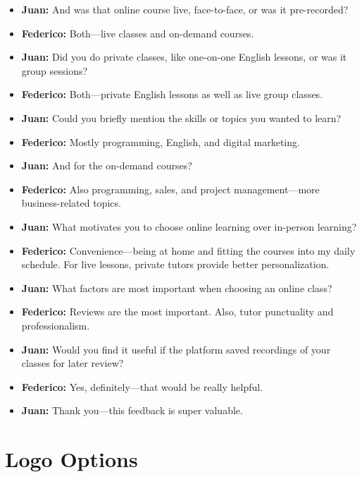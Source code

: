 \begin{enumerate}
\begin{itemize}
        \item \textbf{Juan:} And was that online course live, face-to-face, or was it pre-recorded?
        \item \textbf{Federico:} Both—live classes and on-demand courses.
        \item \textbf{Juan:} Did you do private classes, like one-on-one English lessons, or was it group sessions?
        \item \textbf{Federico:} Both—private English lessons as well as live group classes.
        \item \textbf{Juan:} Could you briefly mention the skills or topics you wanted to learn?
        \item \textbf{Federico:} Mostly programming, English, and digital marketing.
        \item \textbf{Juan:} And for the on-demand courses?
        \item \textbf{Federico:} Also programming, sales, and project management—more business-related topics.
        \item \textbf{Juan:} What motivates you to choose online learning over in-person learning?
        \item \textbf{Federico:} Convenience—being at home and fitting the courses into my daily schedule.
        For live lessons, private tutors provide better personalization.
        \item \textbf{Juan:} What factors are most important when choosing an online class?
        \item \textbf{Federico:} Reviews are the most important.
        Also, tutor punctuality and professionalism.
        \item \textbf{Juan:} Would you find it useful if the platform saved recordings of your classes for later review?
        \item \textbf{Federico:} Yes, definitely—that would be really helpful.
        \item \textbf{Juan:} Thank you—this feedback is super valuable.
    \end{itemize}
\end{enumerate}

\section{Logo Options}\label{sec:logo-options}
